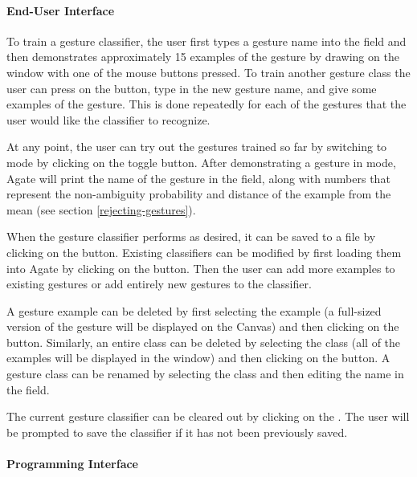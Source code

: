 \begin{group}
\paragraph{End-User Interface}

To train a gesture classifier, the user first types a gesture name into
the  field and then demonstrates approximately
15 examples of the gesture by drawing on the  window with
one of the mouse buttons pressed.  To train another gesture class the
user can press on the  button, type in the new gesture
name, and give some examples of the gesture. This is done repeatedly for
each of the gestures that the user would like the classifier to
recognize.
\end{group}
\vspace{1 line}

At any point, the user can try out the gestures trained so far by
switching to  mode by clicking on the 
toggle button.  After demonstrating a gesture in  mode,
Agate will print the name of the gesture in the  field, along with numbers that represent the non-ambiguity
probability and distance of the example from the mean (see section
\ref{rejecting-gestures}).

When the gesture classifier performs as desired, it can be saved to a
file by clicking on the  button.  Existing
classifiers can be modified by first loading them into Agate by
clicking on the  button.  Then the user can add
more examples to existing gestures or add entirely new gestures to the
classifier.

A gesture example can be deleted by first selecting the example (a
full-sized version of the gesture will be displayed on the Canvas) and
then clicking on the  button.  Similarly, an entire
class can be deleted by selecting the class (all of the examples
will be displayed in the  window) and then clicking on
the  button.  A gesture class can be renamed by
selecting the class and then editing the name in the  field.

The current gesture classifier can be cleared out by clicking on
the .  The user will be prompted to save the
classifier if it has not been previously saved.

\paragraph{Programming Interface}

